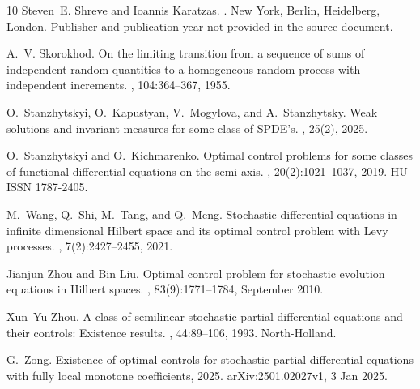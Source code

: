 \documentclass[a4paper,12pt]{article}
\numberwithin{equation}{section}
\begin{document}
\begin{thebibliography}{10}
Steven~E. Shreve and Ioannis Karatzas.
.
\newblock New York, Berlin, Heidelberg, London.
\newblock Publisher and publication year not provided in the source document.

A.~V. Skorokhod.
\newblock On the limiting transition from a sequence of sums of independent random quantities to a homogeneous random process with independent increments.
, 104:364--367, 1955.

O.~Stanzhytskyi, O.~Kapustyan, V.~Mogylova, and A.~Stanzhytsky.
\newblock Weak solutions and invariant measures for some class of {SPDE's}.
, 25(2), 2025.

O.~Stanzhytskyi and O.~Kichmarenko.
\newblock Optimal control problems for some classes of functional-differential equations on the semi-axis.
, 20(2):1021--1037, 2019.
\newblock HU ISSN 1787-2405.

M.~Wang, Q.~Shi, M.~Tang, and Q.~Meng.
\newblock Stochastic differential equations in infinite dimensional {Hilbert} space and its optimal control problem with {Levy} processes.
, 7(2):2427--2455, 2021.

Jianjun Zhou and Bin Liu.
\newblock Optimal control problem for stochastic evolution equations in {Hilbert} spaces.
, 83(9):1771--1784, September 2010.

Xun~Yu Zhou.
\newblock A class of semilinear stochastic partial differential equations and their controls: Existence results.
, 44:89--106, 1993.
\newblock North-Holland.

G.~Zong.
\newblock Existence of optimal controls for stochastic partial differential equations with fully local monotone coefficients, 2025.
\newblock arXiv:2501.02027v1, 3 Jan 2025.

\end{thebibliography}
\end{document}
